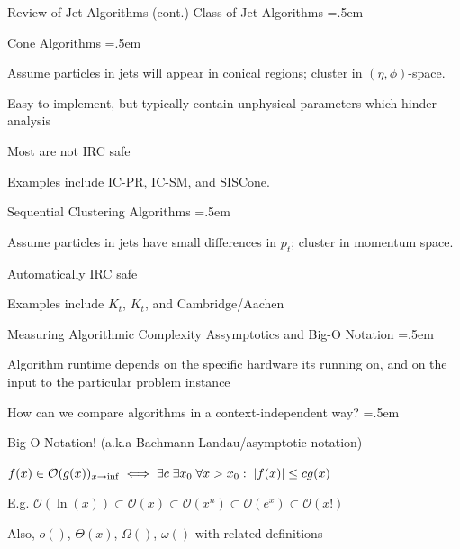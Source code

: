 \documentclass[xcolor={dvipsnames}]{beamer}
\let\olditemize=\itemize
\let\endolditemize=\enditemize
\renewenvironment{itemize}{\olditemize \itemsep=.5em }{\endolditemize}
\newcommand{\ord}[1]{\mathcal{O}(#1)}
\begin{document}
\begin{frame}{Review of Jet Algorithms (cont.)}
\alert{Class of Jet Algorithms}
\begin{itemize}
    \item<2-> Cone Algorithms
    \begin{itemize}
        \item<3-> Assume particles in jets will appear in conical regions; cluster in $(\eta, \phi)$-space.
        \item<4-> Easy to implement, but typically contain unphysical parameters which hinder analysis
        \item<5-> Most are not IRC safe
        \item<6-> Examples include IC-PR, IC-SM, and SISCone.
    \end{itemize}
    \item<7-> Sequential Clustering Algorithms
    \begin{itemize}
        \item<8-> Assume particles in jets have small differences in $p_t$; cluster in momentum space.
        \item<9-> Automatically IRC safe
        \item<10-> Examples include $K_t$, $\bar{K}_t$, and Cambridge/Aachen
    \end{itemize}
\end{itemize}
\end{frame}

\begin{frame}{Measuring Algorithmic Complexity}
\alert{Assymptotics and Big-O Notation}
\begin{itemize}
    \item<2-> Algorithm runtime depends on the specific hardware its running on, and on the input to the particular problem instance
    \item<3-> How can we compare algorithms in a context-independent way?
    \begin{itemize}
        \item<4-> Big-O Notation! (a.k.a Bachmann-Landau/asymptotic notation)
        \item<5->[] $f(x) \in \ord{g(x)}_{x\to\inf} \iff \exists c\; \exists x_0\; \forall x>x_0:\; \abs{f(x)} \leq cg(x)$
        \item<6-> E.g. $\ord{\ln(x)} \subset \ord{x} \subset \ord{x^n} \subset \ord{e^x} \subset \ord{x!}$
        \item<7-> Also, $o()$, $\Theta(x)$, $\Omega()$, $\omega()$ with related definitions
    \end{itemize}
    
\end{itemize}
\end{frame}
\end{document}
